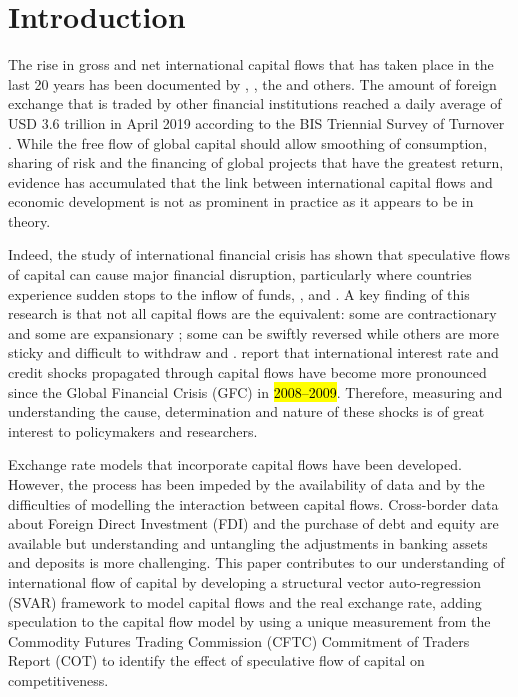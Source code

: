 \documentclass[jrfm,article,accept,moreauthors,pdftex]{Definitions/mdpi}
\begin{document}

\section{Introduction}

The rise in gross and net international capital flows that has taken place in the last 20 years has been documented by \citep{PLane2007}, \citep{obstfeldtaylor}, the \citep{BISFX2013} and others. The amount of foreign exchange that is traded by {other financial institutions} reached a daily average of USD 3.6 trillion in April 2019 according to the BIS Triennial Survey of Turnover \citep{BISFX2019}.  While the free flow of global capital should allow smoothing of consumption, sharing of risk and the financing of global projects that have the greatest return, evidence has accumulated that the link between international capital flows and economic development is not as prominent in practice as it appears to be in theory.  

Indeed, the study of international financial crisis has shown that speculative flows of capital can cause major financial disruption, particularly where countries experience {sudden stops} to the inflow of funds, \citep{CalvoSS}, \citep{DornbuschSS} and \mbox{\citep{KrugmanSS}}.  A key finding of this research is that not all capital flows are the equivalent: some are contractionary and some are expansionary \citep{Blanchard2015}; some can be swiftly reversed while others are more sticky and difficult to withdraw \citep{ChuhanPerez-QuirosPopper} and \mbox{\citep{ClaessensDooleyWarner}}. \citep{Keef2021} report that international interest rate and credit shocks propagated through capital flows have become more pronounced since the Global Financial Crisis (GFC) in \hl{2008--2009}. %
Therefore, measuring and understanding the cause, determination and nature of these shocks is of great interest to policymakers and researchers. 

Exchange rate models that incorporate capital flows have been developed. However, the process has been impeded by the availability of data and by the difficulties of modelling the interaction between capital flows. Cross-border data about Foreign Direct Investment (FDI) and the purchase of debt and equity are available but understanding and untangling the adjustments in banking assets and deposits is more challenging.  This paper contributes to our understanding of international flow of capital by developing a structural vector auto-regression (SVAR) framework to model capital flows and the real exchange rate, adding speculation to the capital flow model by using a unique measurement from the Commodity Futures Trading Commission (CFTC) Commitment of Traders Report (COT) to identify the effect of speculative flow of capital on competitiveness.  
\end{document}
